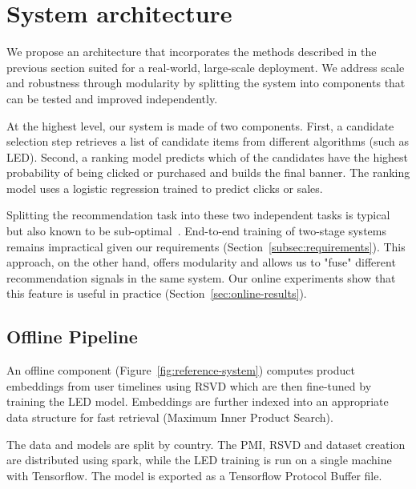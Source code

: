 \documentclass[sigconf]{acmart}
\begin{document}
\section{System architecture}
\label{sec:system-architecture}

We propose an architecture that incorporates the methods described in the previous section suited for a real-world, large-scale deployment. We address scale and robustness through modularity by splitting the system into components that can be tested and improved independently.



At the highest level, our system is made of two components. First, a candidate selection step retrieves a list of candidate items from different algorithms (such as LED). Second, a ranking model predicts which of the candidates have the highest probability of being clicked or purchased and builds the final banner. The ranking model uses a logistic regression trained to predict clicks or sales.

Splitting the recommendation task into these two independent tasks is typical~\cite{amazon-deep-2019} but also known to be sub-optimal~\cite{off-policy-reco-www-2020}.  End-to-end training of two-stage systems remains impractical given our requirements (Section~\ref{subsec:requirements}). This approach, on the other hand, offers modularity and allows us to "fuse" different recommendation signals in the same system. Our online experiments show that this feature is useful in practice (Section~\ref{sec:online-results}). 

\subsection{Offline Pipeline}
\label{subsec:offline-pipline}

An offline component (Figure~\ref{fig:reference-system}) computes product embeddings from user timelines using RSVD which are then fine-tuned by training the LED model. Embeddings are further indexed into an appropriate data structure for fast retrieval (Maximum Inner Product Search). 

The data and models are split by country. The PMI, RSVD and dataset creation are distributed using spark, while the LED training is run on a single machine with Tensorflow. The model is exported as a Tensorflow Protocol Buffer file.
\end{document}
